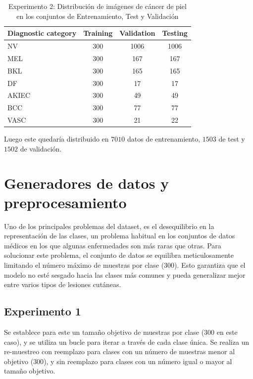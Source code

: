    \begin{table}[ht]
      \centering
      \begin{tabular}{lccc}
      \hline
      \textbf{Diagnostic category} & \textbf{Training} & \textbf{Validation} & \textbf{Testing} \\
      \hline
      NV    & 300 & 1006 & 1006 \\
      MEL   & 300 & 167  & 167  \\
      BKL   & 300 & 165  & 165  \\
      DF    & 300 & 17   & 17   \\
      AKIEC & 300 & 49   & 49   \\
      BCC   & 300 & 77   & 77   \\
      VASC  & 300 & 21   & 22   \\
      \hline
      \end{tabular}
      \caption{Experimento 2: Distribución de imágenes de cáncer de piel en los conjuntos de Entrenamiento, Test y Validación}
      \label{tab:train_test_validate_e2}
      \end{table}
      

Luego este quedaría distribuido en $7010$ datos de entrenamiento, $1503$ de test y $1502$ de validación.

\section{Generadores de datos y preprocesamiento}

Uno de los principales problemas del dataset, es el desequilibrio en la representación de las clases, un problema habitual en los conjuntos de datos médicos en los que algunas enfermedades son más raras que otras. Para solucionar este problema, el conjunto de datos se equilibra meticulosamente limitando el número máximo de muestras por clase ($300$). Esto garantiza que el modelo no esté sesgado hacia las clases más comunes y pueda generalizar mejor entre varios tipos de lesiones cutáneas.

\subsection{Experimento 1}

Se establece para este un tamaño objetivo de muestras por clase ($300$ en este caso), y se utiliza un bucle para iterar a través de cada clase única. Se realiza un re-muestreo con reemplazo para clases con un número de muestras menor al objetivo ($300$), y sin reemplazo para clases con un número igual o mayor al tamaño objetivo.

